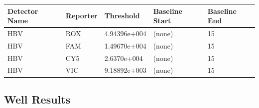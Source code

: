 \documentclass[UTF8,10pt,a4paper,fontset=fandol]{ctexart}
\newcommand{\fieldvalue}[1]{#1}
\begin{document}
\begin{center}
\small
\begin{tabular}{|p{2.4cm}|p{1.6cm}|p{2.4cm}|p{1.7cm}|p{1.7cm}|}
\hline
\textbf{Detector Name} & \textbf{Reporter} & \textbf{Threshold} &
\textbf{Baseline Start} & \textbf{Baseline End}\\
\hline
HBV & ROX &
\fieldvalue{4.94396e+004} &
(none) &
\fieldvalue{15}\\
\hline
HBV & FAM &
\fieldvalue{1.49670e+004} &
(none) &
\fieldvalue{15}\\
\hline
HBV & CY5 &
\fieldvalue{2.6370e+004} &
(none) &
\fieldvalue{15}\\
\hline
HBV & VIC &
\fieldvalue{9.18892e+003} &
(none) &
\fieldvalue{15}\\
\hline
\end{tabular}
\end{center}

\subsection*{Well Results}
\end{document}
